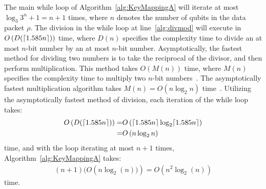 The main while loop of Algorithm~\ref{alg:KeyMappingA} will iterate at most $\log_{3}3^n + 1 = n + 1$ times, where $n$ denotes the number of qubits in the data packet $\rho$. The division in the while loop at line~\ref{alg:divmod} will execute in $O\left(D(\lceil1.585 n\rceil)\right)$ time, where $D\left(n\right)$ specifies the complexity time to divide an at most $n$-bit number by an at most $n$-bit number. Asymptotically, the fastest method for dividing two numbers is to take the reciprocal of the divisor, and then perform multiplication. This method takes $O\left(M(n)\right)$ time, where $M\left(n\right)$ specifies the complexity time to multiply two $n$-bit numbers~\cite{FastDivision,granlund2010gnu}. The asymptotically fastest multiplication algorithm takes $M\left(n\right) = O\left(n\log_2 n\right)$ time~\cite{harvey2021integer}. Utilizing the asymptotically fastest method of division, each iteration of the while loop takes:
\begin{align}
O\left(D(\lceil1.585 n\rceil)\right) = &O\left(\lceil1.585 n\rceil\log_2 \lceil1.585 n\rceil\right)\\
= &O\left(n\log_2 n\right)
\end{align}
time, and with the loop iterating at most $n + 1$ times, Algorithm~\ref{alg:KeyMappingA} takes:
\begin{align}
(n + 1)(O\left(n \log_2(n))\right) = O\left(n^2 \log_2(n)\right)
\end{align}
time.


